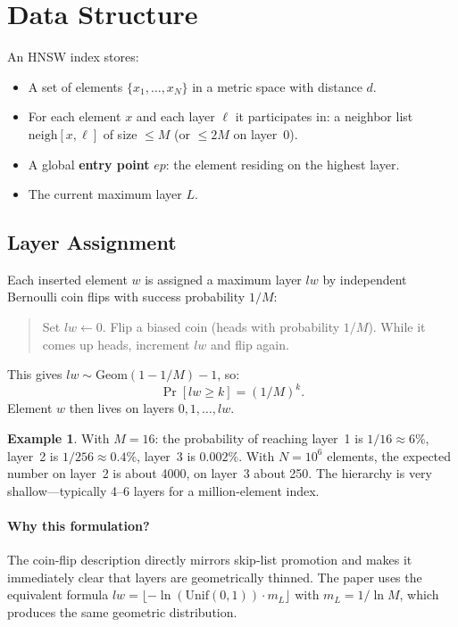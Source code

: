 \documentclass[11pt]{article}
\newcommand{\eps}{\mathit{ep}}
\newcommand{\lw}{\mathit{lw}}
\newcommand{\neigh}{\mathrm{neigh}}
\theoremstyle{definition}
\newtheorem{example}{Example}
\begin{document}
\section{Data Structure}

An HNSW index stores:
\begin{itemize}
  \item A set of elements $\{x_1, \ldots, x_N\}$ in a metric space with distance $d$.
  \item For each element $x$ and each layer $\ell$ it participates in: a neighbor list $\neigh[x, \ell]$ of size $\leq M$ (or $\leq 2M$ on layer~0).
  \item A global \textbf{entry point} $\eps$: the element residing on the highest layer.
  \item The current maximum layer $L$.
\end{itemize}

\subsection{Layer Assignment}
\label{sec:layers}

Each inserted element $w$ is assigned a maximum layer $\lw$ by independent Bernoulli coin flips with success probability $1/M$:
\begin{quote}
  Set $\lw \gets 0$. Flip a biased coin (heads with probability $1/M$). While it comes up heads, increment $\lw$ and flip again.
\end{quote}
This gives $\lw \sim \mathrm{Geom}(1 - 1/M) - 1$, so:
\[
  \Pr[\lw \geq k] = (1/M)^k.
\]
Element $w$ then lives on layers $0, 1, \ldots, \lw$.

\begin{example}
  With $M = 16$: the probability of reaching layer~1 is $1/16 \approx 6\%$, layer~2 is $1/256 \approx 0.4\%$, layer~3 is $0.002\%$. With $N = 10^6$ elements, the expected number on layer~2 is about 4000, on layer~3 about 250. The hierarchy is very shallow---typically 4--6 layers for a million-element index.
\end{example}

\paragraph{Why this formulation?} The coin-flip description directly mirrors skip-list promotion and makes it immediately clear that layers are geometrically thinned. The paper uses the equivalent formula $\lw = \lfloor -\ln(\mathrm{Unif}(0,1)) \cdot m_L \rfloor$ with $m_L = 1/\ln M$, which produces the same geometric distribution.
\end{document}
